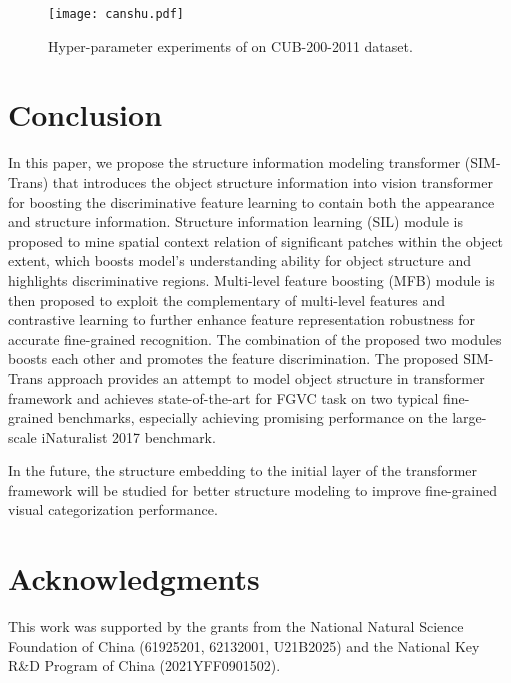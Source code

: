 \documentclass[sigconf, nonacm]{acmart}
\begin{document}
\begin{figure}[t]
  \centering
  \texttt{[image: canshu.pdf]}
  \caption{Hyper-parameter experiments of  on CUB-200-2011 dataset.}
  \label{canshu}
\end{figure}

















\section{Conclusion}
In this paper, we propose the structure information modeling transformer (SIM-Trans) that introduces the object structure information into vision transformer for boosting the discriminative feature learning to contain both the appearance and structure information. Structure information learning (SIL) module is proposed to mine spatial context relation of significant patches within the object extent, which boosts model’s understanding ability for object structure and highlights discriminative regions. Multi-level feature boosting (MFB) module is then proposed to exploit the complementary of multi-level features and contrastive learning to further enhance feature representation robustness for accurate fine-grained recognition. The combination of the proposed two modules boosts each other and promotes the feature discrimination. The proposed SIM-Trans approach provides an attempt to model object structure in transformer framework and achieves state-of-the-art for FGVC task on two typical fine-grained benchmarks, especially achieving promising performance on the large-scale iNaturalist 2017 benchmark.

In the future, the structure embedding to the initial layer of the transformer framework will be studied for better structure modeling to improve fine-grained visual categorization performance.

\section{Acknowledgments}
This work was supported by the grants from the National Natural Science Foundation of China (61925201, 62132001, U21B2025) and the National Key R\&D Program of China (2021YFF0901502).








\newpage
\balance








\end{document}
